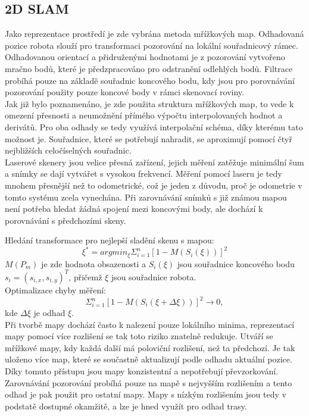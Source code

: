 \documentclass[12pt]{report}
\begin{document}
\subsection{2D SLAM}
Jako reprezentace prostředí je zde vybrána metoda mřížkových map. Odhadovaná pozice robota slouží pro transformaci pozorování na lokální souřadnicový rámec. Odhadovanou orientací a přidruženými hodnotami je z pozorování vytvořeno mračno bodů, které je předzpracováno pro odstranění odlehlých bodů. Filtrace probíhá pouze na základě souřadnic koncového bodu, kdy jsou pro porovnávání pozorování použity pouze koncové body v rámci skenovací roviny.\\
\indent Jak již bylo poznamenáno, je zde použita struktura mřížkových map, to vede k omezení přesnosti a neumožnění přímého výpočtu interpolovaných hodnot a derivátů. Pro oba odhady se tedy využívá interpolační schéma, díky kterému tato možnost je. Souřadnice, které se potřebují nahradit, se aproximují pomocí čtyř nejbližších celočíselných souřadnic. \\
\indent Laserové skenery jsou velice přesná zařízení, jejich měření zatěžuje minimální šum a snímky se dají vytvářet s vysokou frekvencí. Měření pomocí laseru je tedy mnohem přesnější než to odometrické, což je jeden z důvodu, proč je odometrie v tomto systému zcela vynechána. Při zarovnávání snímků s již známou mapou není potřeba hledat žádná spojení mezi koncovými body, ale dochází k porovnávání s předchozími skeny.  

Hledání transformace pro nejlepší sladění skenu s mapou:
\begin{equation}
	\xi^*=argmin_\xi\Sigma_{i=1}^n[1-M(S_i(\xi))]^2
\end{equation}
$M(P_m)$ je zde hodnota obsazenosti a $S_i(\xi)$ jsou souřadnice koncového bodu $s_i=(s_{i,x},s_{i,y})^T$, přičemž $\xi$ jsou souřadnice robota.\\
 
Optimalizace chyby měření: 
\begin{equation}
	\Sigma_{i=1}^n[1-M(S_i(\xi+\Delta\xi))]^2\rightarrow 0,
\end{equation}
kde $\Delta\xi$ je odhad $\xi$.\\
\indent Při tvorbě mapy dochází často k nalezení pouze lokálního minima, reprezentací mapy pomocí více rozlišení se tak toto riziko znatelně redukuje. Utváří se mřížkové mapy, kdy každá další má poloviční rozlišení, než ta předchozí. Je tak uloženo více map, které se součastně aktualizují podle odhadu aktuální pozice. Díky tomuto přístupu jsou mapy konzistentní a nepotřebují převzorkování. Zarovnávání pozorování probíhá pouze na mapě s nejvyšším rozlišením a tento odhad je pak použit pro ostatní mapy. Mapy s nízkým rozlišením jsou tedy v podstatě dostupné okamžitě, a lze je hned využít pro odhad trasy. 
\end{document}
